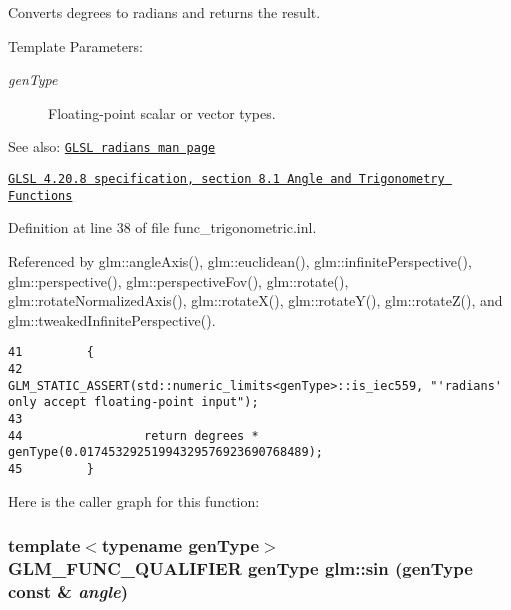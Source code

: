 Converts degrees to radians and returns the result.

\begin{Desc}
\item[Template Parameters:]
\begin{description}
\item[{\em genType}]Floating-point scalar or vector types.\end{description}
\end{Desc}
\begin{Desc}
\item[See also:]\href{http://www.opengl.org/sdk/docs/manglsl/xhtml/radians.xml}{\tt GLSL radians man page} 

\href{http://www.opengl.org/registry/doc/GLSLangSpec.4.20.8.pdf}{\tt GLSL 4.20.8 specification, section 8.1 Angle and Trigonometry Functions} \end{Desc}


Definition at line 38 of file func\_\-trigonometric.inl.

Referenced by glm::angleAxis(), glm::euclidean(), glm::infinitePerspective(), glm::perspective(), glm::perspectiveFov(), glm::rotate(), glm::rotateNormalizedAxis(), glm::rotateX(), glm::rotateY(), glm::rotateZ(), and glm::tweakedInfinitePerspective().

\begin{Code}\begin{verbatim}41         {
42                 GLM_STATIC_ASSERT(std::numeric_limits<genType>::is_iec559, "'radians' only accept floating-point input");
43 
44                 return degrees * genType(0.01745329251994329576923690768489);
45         }
\end{verbatim}
\end{Code}




Here is the caller graph for this function:\hypertarget{group__core__func__trigonometric_gd4d4eda735d915be9af695fe2b4cded2}{
\subsubsection[sin]{\setlength{\rightskip}{0pt plus 5cm}template$<$typename genType$>$ GLM\_\-FUNC\_\-QUALIFIER genType glm::sin (genType const \& {\em angle})}}
\label{group__core__func__trigonometric_gd4d4eda735d915be9af695fe2b4cded2}


